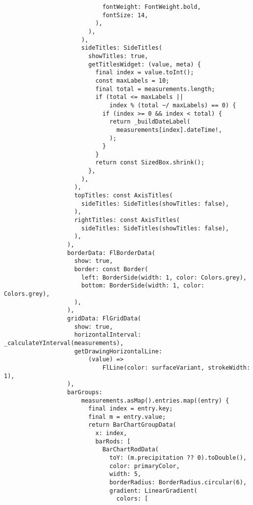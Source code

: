 \begin{verbatim}
                            fontWeight: FontWeight.bold,
                            fontSize: 14,
                          ),
                        ),
                      ),
                      sideTitles: SideTitles(
                        showTitles: true,
                        getTitlesWidget: (value, meta) {
                          final index = value.toInt();
                          const maxLabels = 10;
                          final total = measurements.length;
                          if (total <= maxLabels ||
                              index % (total ~/ maxLabels) == 0) {
                            if (index >= 0 && index < total) {
                              return _buildDateLabel(
                                measurements[index].dateTime!,
                              );
                            }
                          }
                          return const SizedBox.shrink();
                        },
                      ),
                    ),
                    topTitles: const AxisTitles(
                      sideTitles: SideTitles(showTitles: false),
                    ),
                    rightTitles: const AxisTitles(
                      sideTitles: SideTitles(showTitles: false),
                    ),
                  ),
                  borderData: FlBorderData(
                    show: true,
                    border: const Border(
                      left: BorderSide(width: 1, color: Colors.grey),
                      bottom: BorderSide(width: 1, color: Colors.grey),
                    ),
                  ),
                  gridData: FlGridData(
                    show: true,
                    horizontalInterval: _calculateYInterval(measurements),
                    getDrawingHorizontalLine:
                        (value) =>
                            FlLine(color: surfaceVariant, strokeWidth: 1),
                  ),
                  barGroups:
                      measurements.asMap().entries.map((entry) {
                        final index = entry.key;
                        final m = entry.value;
                        return BarChartGroupData(
                          x: index,
                          barRods: [
                            BarChartRodData(
                              toY: (m.precipitation ?? 0).toDouble(),
                              color: primaryColor,
                              width: 5,
                              borderRadius: BorderRadius.circular(6),
                              gradient: LinearGradient(
                                colors: [

\end{verbatim}
